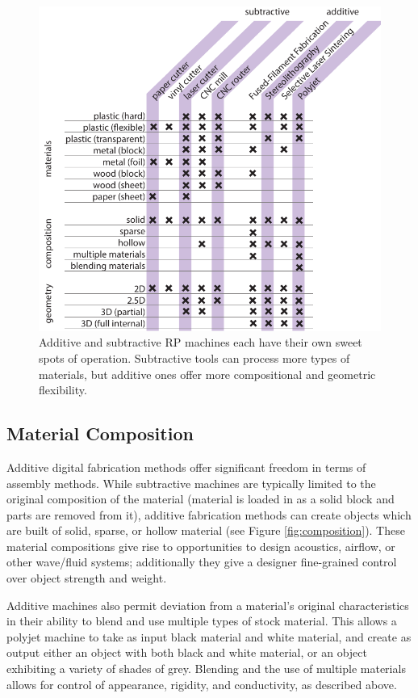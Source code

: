\begin{figure}
\centering
\includegraphics[width=5in]{figures/materials-machines.pdf}
\caption{Additive and subtractive RP machines each have their own sweet spots of operation. Subtractive tools can process more types of materials, but additive ones offer more compositional and geometric flexibility.}
\label{table:materials-machines}
\end{figure}

\subsection{Material Composition}

Additive digital fabrication methods offer significant freedom in terms of assembly methods. While subtractive machines are typically limited to the original composition of the material (material is loaded in as a solid block and parts are removed from it), additive fabrication methods can create objects which are built of solid, sparse, or hollow material (see Figure \ref{fig:composition}). These material compositions give rise to opportunities to design acoustics, airflow, or other wave/fluid systems; additionally they give a designer fine-grained control over object strength and weight.

Additive machines also permit deviation from a material's original characteristics in their ability to blend and use multiple types of stock material. This allows a polyjet machine to take as input black material and white material, and create as output either an object with both black and white material, or an object exhibiting a variety of shades of grey. Blending and the use of multiple materials allows for control of appearance, rigidity, and conductivity, as described above.

